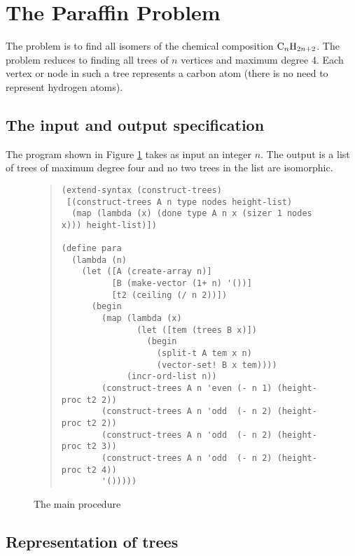 \section{The Paraffin Problem}

The problem is to find all isomers of the chemical composition
${\rm C}_{n}{\rm H}_{2n+2}$.  The problem reduces to finding all trees of
$n$ vertices and maximum degree 4.  Each vertex or node in such a tree
represents a carbon atom (there is no need to represent hydrogen atoms).

\subsection{The input and output specification}

The program  shown in Figure \ref{fig:para} takes as input an
integer $n$.  The output is a list of trees of maximum degree four and no two
trees in the list are isomorphic.

\begin{figure}
\begin{frameit}
\begin{quote}
\begin{verbatim}
(extend-syntax (construct-trees)
 [(construct-trees A n type nodes height-list)
  (map (lambda (x) (done type A n x (sizer 1 nodes x))) height-list)])

(define para
  (lambda (n)
    (let ([A (create-array n)]
          [B (make-vector (1+ n) '())]
          [t2 (ceiling (/ n 2))])
      (begin
        (map (lambda (x)
               (let ([tem (trees B x)])
                 (begin
                   (split-t A tem x n)
                   (vector-set! B x tem))))
             (incr-ord-list n))
        (construct-trees A n 'even (- n 1) (height-proc t2 2))
        (construct-trees A n 'odd  (- n 2) (height-proc t2 2))
        (construct-trees A n 'odd  (- n 2) (height-proc t2 3))
        (construct-trees A n 'odd  (- n 2) (height-proc t2 4))
        '()))))
\end{verbatim}
\end{quote}
\caption{The main procedure}
\label{fig:para}
\end{frameit}
\end{figure}

\subsection{Representation of trees}

